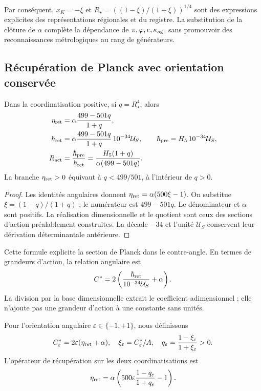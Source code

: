 Par conséquent, \(x_K=-\xi\) et \(R_\star=((1-\xi)/(1+\xi))^{1/4}\) sont des expressions explicites des représentations régionales et du registre. La substitution de la clôture de \(\alpha\) complète la dépendance de \(\pi,\varphi,e,\kappa_{\rm ag}\), sans promouvoir des reconnaissances métrologiques au rang de générateurs.

\subsection{Récupération de Planck avec orientation conservée}

\begin{theorem}
\label{rec:thm:accion}
Dans la coordinatisation positive, si \(q=R_\star^4\), alors
\begin{align}
 \eta_{\rm ret}&=\alpha\frac{499-501q}{1+q},\label{rec:eq:eta-radio}\\
 \hbar_{\rm ret}&=\alpha\frac{499-501q}{1+q}\,10^{-34}\mathcal U_S,
 \qquad\hbar_{\rm pre}=H_5\,10^{-34}\mathcal U_S,\label{rec:eq:planck-radio}\\
 R_{\rm act}&=\frac{\hbar_{\rm pre}}{\hbar_{\rm ret}}
 =\frac{H_5(1+q)}{\alpha(499-501q)}.\label{rec:eq:ratio-radio}
\end{align}
La branche \(\eta_{\rm ret}>0\) équivaut à \(q<499/501\), à l’intérieur de \(q>0\).

\end{theorem}
\begin{proof}
Les identités angulaires donnent \(\eta_{\rm ret}=\alpha(500\xi-1)\). On substitue \(\xi=(1-q)/(1+q)\) ; le numérateur est \(499-501q\). Le dénominateur et \(\alpha\) sont positifs. La réalisation dimensionnelle et le quotient sont ceux des sections d'action préalablement construites. La décade \(-34\) et l'unité \(\mathcal U_S\) conservent leur dérivation déterminantale antérieure.
\end{proof}

Cette formule explicite la section de Planck dans le contre-angle. En termes de grandeurs d’action, la relation angulaire est
\[
 C^*=2\left(\frac{\hbar_{\rm ret}}{10^{-34}\mathcal U_S}+\alpha\right).
\]
La division par la base dimensionnelle extrait le coefficient adimensionnel ; elle n’ajoute pas une grandeur d’action à une constante sans unités.


Pour l’orientation angulaire \(\varepsilon\in\{-1,+1\}\), nous définissons
\[
 C^*_{\varepsilon}=2\varepsilon(\eta_{\rm ret}+\alpha),\quad
 \xi_\varepsilon=C^*_{\varepsilon}/A,\quad
 q_\varepsilon=\frac{1-\xi_\varepsilon}{1+\xi_\varepsilon}>0.
\]
L’opérateur de récupération sur les deux coordinatisations est
\begin{equation}
 \eta_{\rm ret}=\alpha\left(500\varepsilon
        \frac{1-q_\varepsilon}{1+q_\varepsilon}-1\right).
 \label{rec:eq:eta-orientada}
\end{equation}

